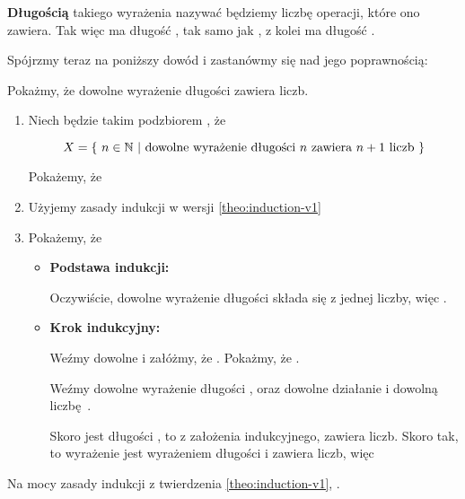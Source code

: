 \textbf{Długością} takiego wyrażenia nazywać będziemy liczbę operacji, które ono zawiera. Tak więc  ma długość , tak samo jak , z kolei  ma długość .

Spójrzmy teraz na poniższy dowód i zastanówmy się nad jego poprawnością:

\begin{example}
Pokażmy, że dowolne wyrażenie długości  zawiera  liczb.

\begin{enumerate}
    \item Niech  będzie takim podzbiorem , że
    
    \[
        X = \{\ n \in \mathbb{N}\ |\ \text{dowolne wyrażenie długości } n \text{ zawiera } n+1 \text{ liczb}\ \}
    \]
    
    Pokażemy, że 
    
    \item Użyjemy zasady indukcji w wersji \ref{theo:induction-v1}
    
    \item Pokażemy, że
    
    \begin{itemize}
        \item \textbf{Podstawa indukcji:} 
        
        Oczywiście, dowolne wyrażenie długości  składa się z jednej liczby, więc .
        
        \item \textbf{Krok indukcyjny:} 
        
        Weźmy dowolne  i załóżmy, że . Pokażmy, że . 
        
        Weźmy dowolne wyrażenie \m{\varphi} długości , oraz dowolne działanie \m{\diamond} i dowolną liczbę~. 
        
        Skoro \m{\varphi} jest długości , to z założenia indukcyjnego, \m{\varphi} zawiera  liczb. Skoro tak, to wyrażenie  jest wyrażeniem długości  i zawiera  liczb, więc 
    \end{itemize}
\end{enumerate}

Na mocy zasady indukcji z twierdzenia \ref{theo:induction-v1}, .
\end{example}

